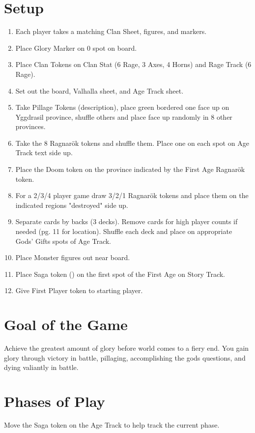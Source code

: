 \documentclass[12pt]{article}
\newenvironment{enumerateCustom}
{\begin{enumerate}
  \setlength{\itemsep}{1pt}
  \setlength{\parskip}{0pt}
  \setlength{\parsep}{0pt}}
{\end{enumerate}}
\begin{document}
\begin{multicols*}{2}

\section*{Setup}
\begin{enumerateCustom}
    \item Each player takes a matching Clan Sheet, figures, and markers.
    \item Place Glory Marker on 0 spot on board.
    \item Place Clan Tokens on Clan Stat (6 Rage, 3 Axes, 4 Horns) and Rage Track (6 Rage).
    \item Set out the board, Valhalla sheet, and Age Track sheet.
    \item Take Pillage Tokens (description), place green bordered one face up on Yggdrasil province, shuffle others and place face up randomly in 8 other provinces.
    \item Take the 8 Ragnar\"ok tokens and shuffle them. Place one on each spot on Age Track text side up.
    \item Place the Doom token on the province indicated by the First Age Ragnar\"ok token.
    \item For a 2/3/4 player game draw 3/2/1 Ragnar\"ok tokens and place them on the indicated regions "destroyed" side up.
    \item Separate cards by backs (3 decks). Remove cards for high player counts if needed (pg. 11 for location). Shuffle each deck and place on appropriate Gods' Gifts spots of Age Track.
    \item Place Monster figures out near board.
    \item Place Saga token () on the first spot of the First Age on Story Track.
    \item Give First Player token to starting player.
\end{enumerateCustom}

\section*{Goal of the Game}
Achieve the greatest amount of glory before world comes to a fiery end. You gain glory through victory in battle, pillaging, accomplishing the gods questions, and dying valiantly in battle.

\section*{Phases of Play}
Move the Saga token on the Age Track to help track the current phase.


\end{multicols*}
\end{document}
